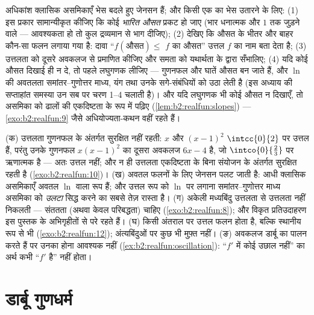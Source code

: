 \begin{method}\label{met:b2:realfun:spotting}
अधिकांश क्लासिक असमिकाएँ भेस बदले हुए जेनसन हैं; और किसी एक का भेस
उतारने के लिए: (1) इस प्रकार सामान्यीकृत कीजिए कि कोई \emph{भारित औसत}
प्रकट हो जाए (भार धनात्मक और $1$ तक जुड़ने वाले --- आवश्यकता हो तो कुल
द्रव्यमान से भाग दीजिए); (2) देखिए कि औसत के भीतर और बाहर कौन-सा फलन
लगाया गया है: दावा ``$f(\text{औसत}) \leq$ $f$ का औसत'' उत्तल $f$ का नाम
बता देता है; (3) उत्तलता को दूसरे अवकलज से प्रमाणित कीजिए और समता को
यथार्थता के द्वारा सँभालिए; (4) यदि कोई औसत दिखाई ही न दे, तो पहले
लघुगणक लीजिए --- गुणनफल और घातें औसत बन जाते हैं, और $\ln$ की अवतलता
समांतर--गुणोत्तर माध्य, यंग तथा उनके सगे-संबंधियों को उठा लेती है (इस
अध्याय की सप्ताहांत समस्या उन सब पर चरण 1--4 चलाती है)। और यदि लघुगणक भी
कोई औसत न दिखाएँ, तो असमिका को ढालों की एकदिष्टता के रूप में पढ़िए (\cref{lem:b2:realfun:slopes})
--- \cref{exo:b2:realfun:9} जैसे अधियोज्यता-कथन वहीं रहते हैं।
\end{method}

\begin{remark}[सामान्य भूलें]\label{rem:b2:realfun:pitfalls}
(क) उत्तलता गुणनफल के अंतर्गत सुरक्षित नहीं रहती: $x$ और $(x - 1)^2$ $\intcc{0}{2}$ पर
उत्तल हैं, परंतु उनके गुणनफल $x(x-1)^2$ का दूसरा अवकलज $6x - 4$ है, जो $\intco{0}{\frac23}$ पर
ऋणात्मक है --- अतः उत्तल नहीं; और न ही उत्तलता एकदिष्टता के बिना संयोजन
के अंतर्गत सुरक्षित रहती है (\cref{exo:b2:realfun:10})। (ख) अवतल फलनों के लिए जेनसन पलट जाती
है: आधी क्लासिक असमिकाएँ अवतल $\ln$ वाला रूप हैं; और उत्तल रूप को $\ln$ पर
लगाना समांतर--गुणोत्तर माध्य असमिका को \emph{उलटा} सिद्ध करने का सबसे
तेज़ रास्ता है। (ग) अकेली मध्यबिंदु उत्तलता से उत्तलता नहीं निकलती ---
संततता (अथवा केवल परिबद्धता) चाहिए (\cref{exo:b2:realfun:8}); और विकृत प्रतिउदाहरण इस
पुस्तक के अभिगृहीतों से परे रहते हैं। (घ) किसी \emph{} अंतराल पर
उत्तल फलन  होता है, बल्कि स्थानीय रूप से  भी (\cref{exo:b2:realfun:12});
अंत्यबिंदुओं पर कुछ भी मुफ़्त नहीं। (ङ) अवकलज डार्बू का पालन करते हैं पर
उनका  होना आवश्यक नहीं (\cref{ex:b2:realfun:oscillation}): ``$f'$ में कोई उछाल नहीं'' का अर्थ
कभी ``$f'$  है'' नहीं होता।
\end{remark}

\section{डार्बू गुणधर्म}

